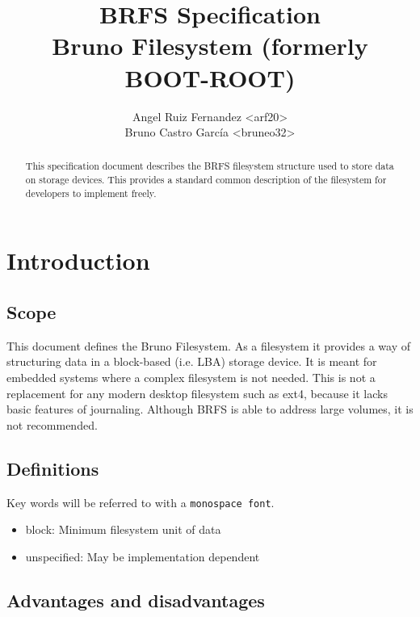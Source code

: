 \documentclass[]{article}
\title{
	\textbf{BRFS Specification} \\
	\large Bruno Filesystem (formerly BOOT-ROOT)
}
\author{
	Angel Ruiz Fernandez \textless arf20\textgreater \\
	Bruno Castro García  \textless bruneo32\textgreater
}
\begin{document}
	\maketitle
	\thispagestyle{fancy}

	\begin{abstract}
		This specification document describes the BRFS filesystem structure used to store data on storage devices. This provides a standard common description of the filesystem for developers to implement freely.
	\end{abstract}

	\begin{versionhistory}
	\end{versionhistory}

	\pagebreak

	\tableofcontents
	\pagebreak

	\section{Introduction}
	\subsection{Scope}

	This document defines the Bruno Filesystem. As a filesystem it provides a way of structuring data in a block-based (i.e. LBA) storage device. It is meant for embedded systems where a complex filesystem is not needed. This is not a replacement for any modern desktop filesystem such as ext4, because it lacks basic features of journaling. Although BRFS is able to address large volumes, it is not recommended.

	\subsection{Definitions}

	Key words will be referred to with a \texttt{monospace font}.

	\begin{itemize}
		\item block: Minimum filesystem unit of data
		\item unspecified: May be implementation dependent
	\end{itemize}

	\subsection{Advantages and disadvantages}
\end{document}
